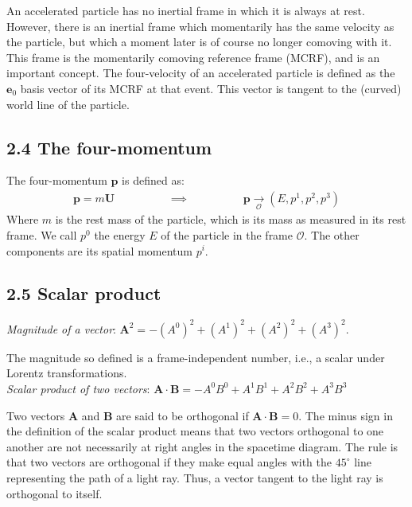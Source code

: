 \documentclass[12pt]{book}
\begin{document}
        An accelerated particle has no inertial frame in which it is always at rest. However, there is an inertial frame which momentarily has the same velocity as the particle, but which a moment later is of course no longer comoving with it. This frame is the momentarily comoving reference frame (MCRF), and is an important concept. The four-velocity of an accelerated particle is defined as the \( \mathbf{e}_0 \) basis vector of its MCRF at that event. This vector is tangent to the (curved) world line of the particle.

    \subsection{2.4 The four-momentum}
        The four-momentum \(\mathbf{p}\) is defined as:
        \begin{align}
            \mathbf{p} = m \mathbf{U} \hspace{2cm} \implies \hspace{2cm} \mathbf{p} \underset{\mathcal{O}}{\rightarrow} (E, p^1, p^2, p^3)
        \end{align}
        Where \(m\) is the rest mass of the particle, which is its mass as measured in its rest frame. We call \(p^0\) the energy \(E\) of the particle in the frame \(\mathcal{O}\). The other components are its spatial momentum \(p^i\).
        
    \subsection{2.5 Scalar product}
        
        \textit{Magnitude of a vector}: \(\mathbf{A}^2 = -(A^0)^2 + (A^1)^2 + (A^2)^2 + (A^3)^2\). 
        
        The magnitude so defined is a frame-independent number, i.e., a scalar under Lorentz transformations.\\ 
        
         \textit{Scalar product of two vectors}: \(\mathbf{A} \cdot \mathbf{B} = -A^0B^0 + A^1B^1 + A^2B^2 + A^3B^3\)
         
        Two vectors \( \mathbf{A} \) and \( \mathbf{B} \) are said to be orthogonal if \( \mathbf{A} \cdot \mathbf{B} = 0 \). The minus sign in the definition of the scalar product means that two vectors orthogonal to one another are not necessarily at right angles in the spacetime diagram. The rule is that two vectors are orthogonal if they make equal angles with the \(45^\circ \) line representing the path of a light ray. Thus, a vector tangent to the light ray is orthogonal to itself.
    
\end{document}
